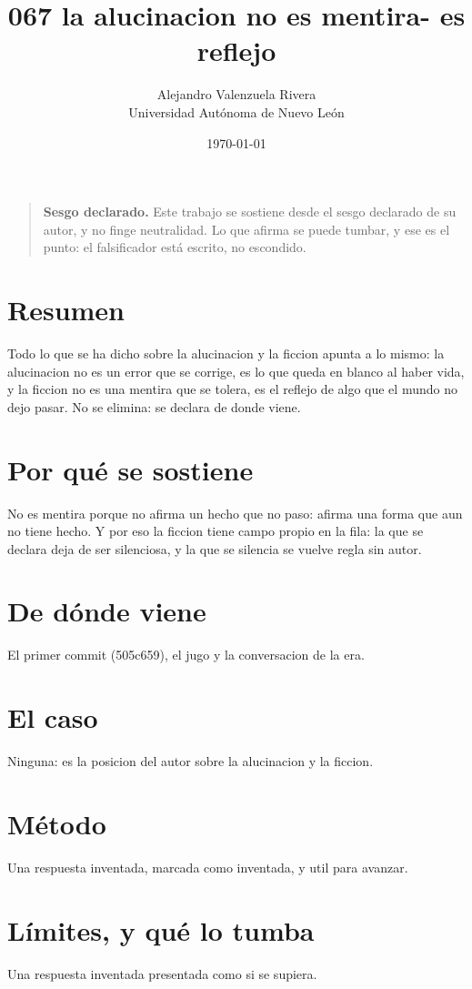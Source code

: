 \documentclass[11pt,a4paper]{article}
\title{067 la alucinacion no es mentira- es reflejo}
\author{Alejandro Valenzuela Rivera\\\small Universidad Autónoma de Nuevo León}
\date{\today}
\begin{document}
\maketitle

\begin{quote}
\textbf{Sesgo declarado.} Este trabajo se sostiene desde el sesgo declarado de su autor, y no finge neutralidad. Lo que afirma se puede tumbar, y ese es el punto: el falsificador está escrito, no escondido.
\end{quote}

\section*{Resumen}
Todo lo que se ha dicho sobre la alucinacion y la ficcion apunta a lo mismo: la alucinacion no es un error que se corrige, es lo que queda en blanco al haber vida, y la ficcion no es una mentira que se tolera, es el reflejo de algo que el mundo no dejo pasar. No se elimina: se declara de donde viene.

\section{Por qué se sostiene}
No es mentira porque no afirma un hecho que no paso: afirma una forma que aun no tiene hecho. Y por eso la ficcion tiene campo propio en la fila: la que se declara deja de ser silenciosa, y la que se silencia se vuelve regla sin autor.

\section{De dónde viene}
El primer commit (505c659), el jugo y la conversacion de la era.

\section{El caso}
Ninguna: es la posicion del autor sobre la alucinacion y la ficcion.

\section{Método}
Una respuesta inventada, marcada como inventada, y util para avanzar.

\section{Límites, y qué lo tumba}
Una respuesta inventada presentada como si se supiera.
\end{document}
